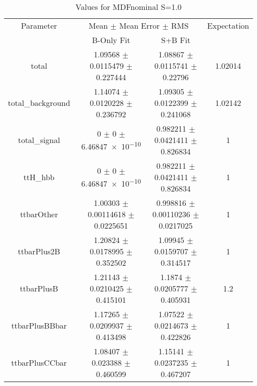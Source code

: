 \begin{table}
\centering
\caption{Values for MDFnominal S=1.0}
\begin{tabular}{cccc}
\toprule
Parameter & \multicolumn{2}{c}{Mean $\pm$ Mean Error $\pm$ RMS} & Expectation\\
 & B-Only Fit & S+B Fit & \\
\midrule
total & \num{1.09568} $\pm$ \num{0.0115479} $\pm$ \num{0.227444} & \num{1.08867} $\pm$ \num{0.0115741} $\pm$ \num{0.22796} & \num{1.02014}\\
total\_background & \num{1.14074} $\pm$ \num{0.0120228} $\pm$ \num{0.236792} & \num{1.09305} $\pm$ \num{0.0122399} $\pm$ \num{0.241068} & \num{1.02142}\\
total\_signal & \num{0} $\pm$ \num{0} $\pm$ \num{6.46847e-10} & \num{0.982211} $\pm$ \num{0.0421411} $\pm$ \num{0.826834} & \num{1}\\
ttH\_hbb & \num{0} $\pm$ \num{0} $\pm$ \num{6.46847e-10} & \num{0.982211} $\pm$ \num{0.0421411} $\pm$ \num{0.826834} & \num{1}\\
ttbarOther & \num{1.00303} $\pm$ \num{0.00114618} $\pm$ \num{0.0225651} & \num{0.998816} $\pm$ \num{0.00110236} $\pm$ \num{0.0217025} & \num{1}\\
ttbarPlus2B & \num{1.20824} $\pm$ \num{0.0178995} $\pm$ \num{0.352502} & \num{1.09945} $\pm$ \num{0.0159707} $\pm$ \num{0.314517} & \num{1}\\
ttbarPlusB & \num{1.21143} $\pm$ \num{0.0210425} $\pm$ \num{0.415101} & \num{1.1874} $\pm$ \num{0.0205777} $\pm$ \num{0.405931} & \num{1.2}\\
ttbarPlusBBbar & \num{1.17265} $\pm$ \num{0.0209937} $\pm$ \num{0.413498} & \num{1.07522} $\pm$ \num{0.0214673} $\pm$ \num{0.422826} & \num{1}\\
ttbarPlusCCbar & \num{1.08407} $\pm$ \num{0.023388} $\pm$ \num{0.460599} & \num{1.15141} $\pm$ \num{0.0237235} $\pm$ \num{0.467207} & \num{1}\\
\bottomrule
\end{tabular}
\end{table}